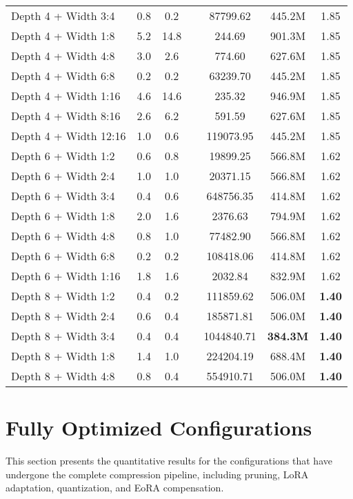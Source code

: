 {\begin{longtable}{lcccccc}
Depth 4 + Width 3:4 & 0.8 & 0.2 & & 87799.62 & 445.2M & 1.85 \\
Depth 4 + Width 1:8 & 5.2 & 14.8 & & 244.69 & 901.3M & 1.85 \\
Depth 4 + Width 4:8 & 3.0 & 2.6 & & 774.60 & 627.6M & 1.85 \\
Depth 4 + Width 6:8 & 0.2 & 0.2 & & 63239.70 & 445.2M & 1.85 \\
Depth 4 + Width 1:16 & 4.6 & 14.6 & & 235.32 & 946.9M & 1.85 \\
Depth 4 + Width 8:16 & 2.6 & 6.2 & & 591.59 & 627.6M & 1.85 \\
Depth 4 + Width 12:16 & 1.0 & 0.6 & & 119073.95 & 445.2M & 1.85 \\
Depth 6 + Width 1:2 & 0.6 & 0.8 & & 19899.25 & 566.8M & 1.62 \\
Depth 6 + Width 2:4 & 1.0 & 1.0 & & 20371.15 & 566.8M & 1.62 \\
Depth 6 + Width 3:4 & 0.4 & 0.6 & & 648756.35 & 414.8M & 1.62 \\
Depth 6 + Width 1:8 & 2.0 & 1.6 & & 2376.63 & 794.9M & 1.62 \\
Depth 6 + Width 4:8 & 0.8 & 1.0 & & 77482.90 & 566.8M & 1.62 \\
Depth 6 + Width 6:8 & 0.2 & 0.2 & & 108418.06 & 414.8M & 1.62 \\
Depth 6 + Width 1:16 & 1.8 & 1.6 & & 2032.84 & 832.9M & 1.62 \\
Depth 8 + Width 1:2 & 0.4 & 0.2 & & 111859.62 & 506.0M &  \textbf{1.40} \\
Depth 8 + Width 2:4 & 0.6 & 0.4 & & 185871.81 & 506.0M &  \textbf{1.40} \\
Depth 8 + Width 3:4 & 0.4 & 0.4 & & 1044840.71 & \textbf{384.3M} & \textbf{1.40} \\
Depth 8 + Width 1:8 & 1.4 & 1.0 & & 224204.19 & 688.4M &  \textbf{1.40} \\
Depth 8 + Width 4:8 & 0.8 & 0.4 & & 554910.71 & 506.0M &  \textbf{1.40} \\
\end{longtable}
}
\normalsize

\section{Fully Optimized Configurations}

This section presents the quantitative results for the configurations that have undergone the complete compression pipeline, including pruning, LoRA adaptation, quantization, and EoRA compensation.

